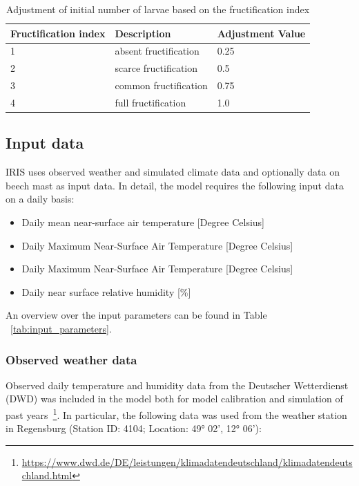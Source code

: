\documentclass[a4paper, 11pt]{scrartcl}
\begin{document}
\begin{table}[h!]
\caption{Adjustment of initial number of larvae based on the fructification index}
\label{tab:fructification_adjustment}
\begin{tabularx}{\textwidth}{@{}lll@{}}
\toprule
\textbf{Fructification index} & \textbf{Description}    & \textbf{Adjustment Value}  	\\
\midrule
1				 	  		  & absent fructification 	& 	0.25	 			\\
2 				 	  		  & scarce fructification	&	0.5					\\
3 					  		  & common fructification	& 	0.75				\\
4					 		  & full fructification 	& 	1.0					\\
\bottomrule
\end{tabularx}
\end{table}

\subsection{Input data}\label{input_data}
IRIS uses observed weather and simulated climate data and optionally data on beech mast as input data. In detail, the model requires the following input data on a daily basis:
\begin{itemize}
\item Daily mean near-surface air temperature [Degree Celsius]
\item Daily Maximum Near-Surface Air Temperature [Degree Celsius]
\item Daily Maximum Near-Surface Air Temperature [Degree Celsius]
\item Daily near surface relative humidity [\%]
\end{itemize}

An overview over the input parameters can be found in Table ~\ref{tab:input_parameters}.

\subsubsection{Observed weather data}
Observed daily temperature and humidity data from the Deutscher Wetterdienst (DWD) was included in the model both for model calibration and simulation of past years~\footnote{\url{https://www.dwd.de/DE/leistungen/klimadatendeutschland/klimadatendeutschland.html}}. In particular, the following data was used from the weather station in Regensburg (Station ID: 4104; Location: 49° 02', 12° 06'):
\end{document}
